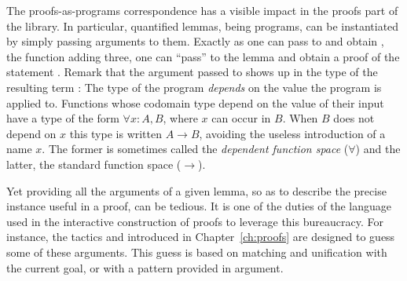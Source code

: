 




The proofs-as-programs correspondence has a visible impact in the proofs
part of the \mcbMC{} library.  In particular, quantified lemmas, being programs,
can be instantiated by simply passing arguments to them.  Exactly as one can
pass  to  and obtain , the function adding three, one
can ``pass''  to the lemma  and obtain a proof of the statement
.  Remark that the argument passed to 
shows up in the type of the resulting term :  The type of the
 program \emph{depends} on the value the program is applied
to.  Functions whose codomain type depend on the value of their input
have a type of the form $\forall x : A, B$, where $x$ can occur in
$B$. When $B$ does not depend on $x$ this type is written
$A\rightarrow B$, avoiding the useless introduction of a name $x$.
The former is sometimes called the \emph{dependent function space}
($\forall$) and the latter, the standard function space ($\to$).


Yet providing all the arguments of a given lemma, so as to describe
the precise instance useful in a proof, can be tedious. It is one of
the duties of the language used in the interactive construction of
proofs to leverage this bureaucracy. For instance, the tactics
 and  introduced in Chapter~\ref{ch:proofs} are
designed to guess some of these arguments. This guess is based on
matching and unification with the current goal, or with a pattern
provided in argument.




